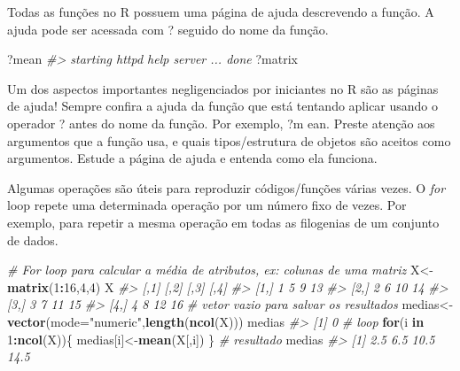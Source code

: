 \documentclass[
]{book}
\newenvironment{Shaded}{\begin{snugshade}}{\end{snugshade}}
\newcommand{\AttributeTok}[1]{\textcolor[rgb]{0.13,0.29,0.53}{#1}}
\newcommand{\CommentTok}[1]{\textcolor[rgb]{0.56,0.35,0.01}{\textit{#1}}}
\newcommand{\ControlFlowTok}[1]{\textcolor[rgb]{0.13,0.29,0.53}{\textbf{#1}}}
\newcommand{\DecValTok}[1]{\textcolor[rgb]{0.00,0.00,0.81}{#1}}
\newcommand{\FunctionTok}[1]{\textcolor[rgb]{0.13,0.29,0.53}{\textbf{#1}}}
\newcommand{\NormalTok}[1]{#1}
\newcommand{\OtherTok}[1]{\textcolor[rgb]{0.56,0.35,0.01}{#1}}
\newcommand{\SpecialCharTok}[1]{\textcolor[rgb]{0.81,0.36,0.00}{\textbf{#1}}}
\newcommand{\StringTok}[1]{\textcolor[rgb]{0.31,0.60,0.02}{#1}}
\begin{document}
Todas as funções no R possuem uma página de ajuda descrevendo a função.
A ajuda pode ser acessada com ?
seguido do nome da função.

\begin{Shaded}
\begin{Highlighting}[]
\NormalTok{?mean}
\CommentTok{\#\textgreater{} starting httpd help server ... done}
\NormalTok{?matrix}
\end{Highlighting}
\end{Shaded}

Um dos aspectos importantes negligenciados por iniciantes no R são as páginas de ajuda!
Sempre confira a ajuda da função que está tentando aplicar usando o operador ?
antes do nome da função.
Por exemplo, ?m
ean.
Preste atenção aos argumentos que a função usa, e quais tipos/estrutura de objetos são aceitos como argumentos.
Estude a página de ajuda e entenda como ela funciona.

Algumas operações são úteis para reproduzir códigos/funções várias vezes.
O \emph{for} loop repete uma determinada operação por um número fixo de vezes.
Por exemplo, para repetir a mesma operação em todas as filogenias de um conjunto de dados.

\begin{Shaded}
\begin{Highlighting}[]
\CommentTok{\# For loop para calcular a média de atributos, ex: colunas de uma matriz}
\NormalTok{X}\OtherTok{\textless{}{-}}\FunctionTok{matrix}\NormalTok{(}\DecValTok{1}\SpecialCharTok{:}\DecValTok{16}\NormalTok{,}\DecValTok{4}\NormalTok{,}\DecValTok{4}\NormalTok{)}
\NormalTok{X}
\CommentTok{\#\textgreater{}      [,1] [,2] [,3] [,4]}
\CommentTok{\#\textgreater{} [1,]    1    5    9   13}
\CommentTok{\#\textgreater{} [2,]    2    6   10   14}
\CommentTok{\#\textgreater{} [3,]    3    7   11   15}
\CommentTok{\#\textgreater{} [4,]    4    8   12   16}
\CommentTok{\# vetor vazio para salvar os resultados}
\NormalTok{medias}\OtherTok{\textless{}{-}}\FunctionTok{vector}\NormalTok{(}\AttributeTok{mode=}\StringTok{"numeric"}\NormalTok{,}\FunctionTok{length}\NormalTok{(}\FunctionTok{ncol}\NormalTok{(X)))}
\NormalTok{medias}
\CommentTok{\#\textgreater{} [1] 0}
\CommentTok{\# loop}
\ControlFlowTok{for}\NormalTok{(i }\ControlFlowTok{in} \DecValTok{1}\SpecialCharTok{:}\FunctionTok{ncol}\NormalTok{(X))\{ }
\NormalTok{ medias[i]}\OtherTok{\textless{}{-}}\FunctionTok{mean}\NormalTok{(X[,i])}
\NormalTok{\}}
\CommentTok{\# resultado}
\NormalTok{medias}
\CommentTok{\#\textgreater{} [1]  2.5  6.5 10.5 14.5}
\end{Highlighting}
\end{Shaded}
\end{document}
